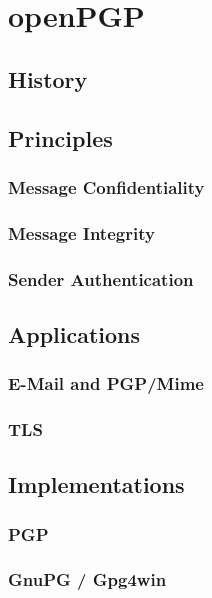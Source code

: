 \chapter{openPGP}

\section{History}

\section{Principles}

\subsection{Message Confidentiality}

\subsection{Message Integrity}

\subsection{Sender Authentication}

\section{Applications}

\subsection{E-Mail and PGP/Mime}

\subsection{TLS}

\section{Implementations}

\subsection{PGP}

\subsection{GnuPG / Gpg4win}

